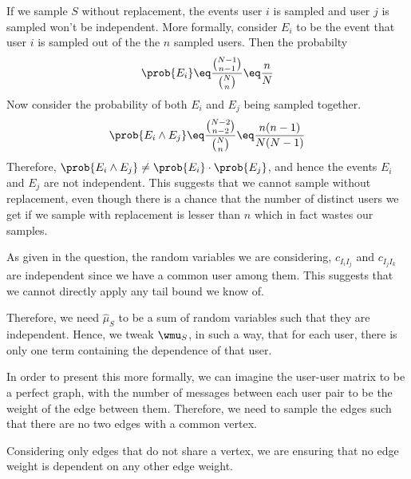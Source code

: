 \documentclass[a4paper,10pt]{article}
\begin{document}
\begin{question}

	\begin{qpart}{1}

		If we sample $S$ without replacement, the events user $i$ is sampled and user $j$ is sampled won't be independent. More formally, consider $E_i$ to be the event that user $i$ is sampled out of the the $n$ sampled users. Then the probabilty
		\begin{align*}
			\prob{E_i}	\eq	\frac{\binom{N - 1}{n - 1}}{\binom{N}{n}}	\eq	\frac{n}{N}
		\end{align*}
		Now consider the probability of both $E_i$ and $E_j$ being sampled together.
		\begin{align*}
			\prob{E_i \land E_j}	\eq	\frac{\binom{N - 2}{n - 2}}{\binom{N}{n}}	\eq	\frac{n (n - 1)}{N (N - 1)}
		\end{align*}
		Therefore, $\prob{E_i \land E_j} \ne \prob{E_i} \cdot \prob{E_j}$, and hence the events $E_i$ and $E_j$ are not independent. This suggests that we cannot sample without replacement, even though there is a chance that the number of distinct users we get if we sample with replacement is lesser than $n$ which in fact wastes our samples.

	\end{qpart}

	\begin{qpart}{2}

		As given in the question, the random variables we are considering, \ie $c_{I_i I_j}$ and $c_{I_j I_k}$ are independent since we have a common user among them. This suggests that we cannot directly apply any tail bound we know of.

		Therefore, we need $\widehat{\mu}_S$ to be a sum of random variables such that they are independent. Hence, we tweak $\wmu_S$, in such a way, that for each user, there is only one term containing the dependence of that user.

		In order to present this more formally, we can imagine the user-user matrix to be a perfect graph, with the number of messages between each user pair to be the weight of the edge between them. Therefore, we need to sample the edges such that there are no two edges with a common vertex.


		Considering only edges that do not share a vertex, we are ensuring that no edge weight is dependent on any other edge weight.


\end{qpart}
\end{question}
\end{document}
